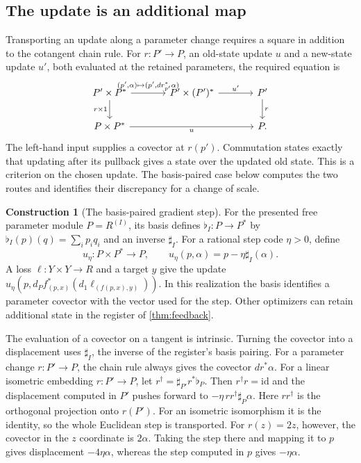 \documentclass[11pt,a4paper]{article}
\theoremstyle{definition}
\newtheorem{construction}[construction]{Construction}
\theoremstyle{remark}\newaliascnt{remark}{theorem}
\newcommand{\id}{\mathrm{id}}
\numberwithin{equation}{section}
\begin{document}
\subsection{The update is an additional map}
Transporting an update along a parameter change requires a square in addition to the cotangent chain rule. For \(r:P'\to P\), an old-state update \(u\) and a new-state update \(u'\), both evaluated at the retained parameters, the required equation is
\[
\begin{tikzcd}[column sep=large]
 P'\times P^*\arrow[r,"{(p',\alpha)\mapsto(p',dr_{p'}^*\alpha)}"]\arrow[d,"r\times1"']&
 P'\times(P')^*\arrow[r,"u'"]&P'\arrow[d,"r"]\\
 P\times P^*\arrow[rr,"u"']&&P .
\end{tikzcd}
\]
The left-hand input supplies a covector at \(r(p')\). Commutation states exactly that updating after its pullback gives a state over the updated old state. This is a criterion on the chosen update. The basis-paired case below computes the two routes and identifies their discrepancy for a change of scale.
\begin{construction}[The basis-paired gradient step]\label{neural:con:optimizer}
For the presented free parameter module $P=R^{(I)}$, its basis defines
$\flat_I:P\to P^*$ by $\flat_I(p)(q)=\sum_i p_iq_i$ and an inverse $\sharp_I$. For a rational step code $\eta>0$, define
\[
 u_\eta:P\times P^*\longrightarrow P,
 \qquad u_\eta(p,\alpha)=p-\eta\sharp_I(\alpha).
\]
A loss $\ell:Y\times Y\to R$ and a target $y$ give the update
$u_\eta(p,d_Pf_{(p,x)}^*(d_1\ell_{(f(p,x),y)}))$.
In this realization the basis identifies a parameter covector with the vector used for the step. Other optimizers can retain additional state in the register of \cref{thm:feedback}.
\end{construction}
The evaluation of a covector on a tangent is intrinsic. Turning the covector into a displacement uses $\sharp_I$, the inverse of the register's basis pairing. For a parameter change $r:P'\to P$, the chain rule always gives the covector $dr^*\alpha$. For a linear isometric embedding $r:P'\to P$, let $r^\dagger=\sharp_{P'}r^*\flat_P$. Then $r^\dagger r=\id$ and the displacement computed in $P'$ pushes forward to $-\eta\,r r^\dagger\sharp_P\alpha$. Here $r r^\dagger$ is the orthogonal projection onto $r(P')$. For an isometric isomorphism it is the identity, so the whole Euclidean step is transported. For $r(z)=2z$, however, the covector in the $z$ coordinate is $2\alpha$. Taking the step there and mapping it to $p$ gives displacement $-4\eta\alpha$, whereas the step computed in $p$ gives $-\eta\alpha$.
\end{document}
